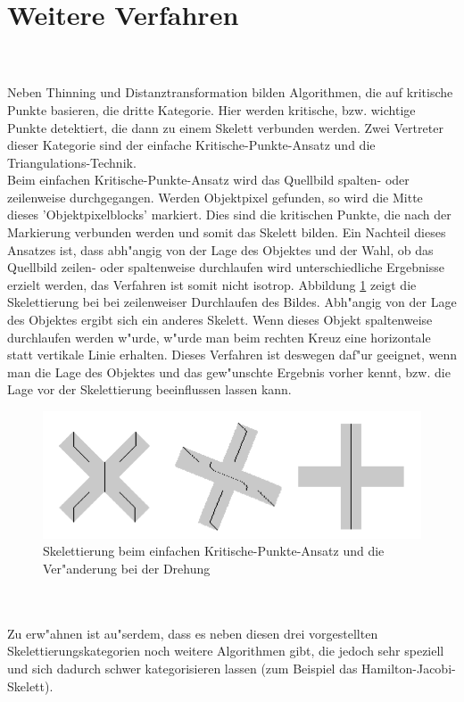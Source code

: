 \section{Weitere Verfahren}
\label{sec:weitere_verfahren}
\\ \\
Neben Thinning und Distanztransformation bilden Algorithmen, die auf kritische Punkte basieren, die dritte Kategorie. Hier werden kritische, bzw. wichtige Punkte detektiert, die dann zu einem Skelett verbunden werden. Zwei Vertreter dieser Kategorie sind der einfache Kritische-Punkte-Ansatz und die Triangulations-Technik. \\ 
Beim einfachen Kritische-Punkte-Ansatz wird das Quellbild spalten- oder zeilenweise durchgegangen. Werden Objektpixel gefunden, so wird die Mitte dieses 'Objektpixelblocks' markiert. Dies sind die kritischen Punkte, die nach der Markierung verbunden werden und somit das Skelett bilden. Ein Nachteil dieses Ansatzes ist, dass abh"angig von der Lage des Objektes und der Wahl, ob das Quellbild zeilen- oder spaltenweise durchlaufen wird unterschiedliche Ergebnisse erzielt werden, das Verfahren ist somit nicht isotrop. Abbildung \ref{fig:isotrop} zeigt die Skelettierung bei bei zeilenweiser Durchlaufen des Bildes. Abh"angig von der Lage des Objektes ergibt sich ein anderes Skelett. Wenn dieses Objekt spaltenweise durchlaufen werden w"urde, w"urde man beim rechten Kreuz eine horizontale statt vertikale Linie erhalten. Dieses Verfahren ist deswegen daf"ur geeignet, wenn man die Lage des Objektes und das gew"unschte Ergebnis vorher kennt, bzw. die Lage vor der Skelettierung beeinflussen lassen kann.
\begin{figure}
\centering
\includegraphics[width=0.8\linewidth]{./fig/isotrop.png}
\caption{Skelettierung beim einfachen Kritische-Punkte-Ansatz und die Ver"anderung bei der Drehung}
\label{fig:isotrop}
\end{figure}
\\ \\
Zu erw"ahnen ist au"serdem, dass es neben diesen drei vorgestellten Skelettierungskategorien noch weitere Algorithmen gibt, die jedoch sehr speziell und sich dadurch schwer kategorisieren lassen (zum Beispiel das Hamilton-Jacobi-Skelett).